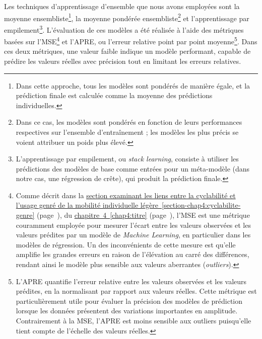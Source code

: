 \begin{refsegment}
Les techniques d'apprentissage d'ensemble que nous avons employées sont la moyenne ensembliste\footnote{
    Dans cette approche, tous les modèles sont pondérés de manière égale, et la prédiction finale est calculée comme la moyenne des prédictions individuelles.
}, la moyenne pondérée ensembliste\footnote{
    Dans ce cas, les modèles sont pondérés en fonction de leurs performances respectives sur l'ensemble d'entraînement ; les modèles les plus précis se voient attribuer un poids plus élevé.
} et l'apprentissage par empilement\footnote{
    L'apprentissage par empilement, ou \textsl{stack learning}, consiste à utiliser les prédictions des modèles de base comme entrées pour un méta-modèle (dans notre cas, une régression de crête), qui produit la prédiction finale.
}. L'évaluation de ces modèles a été réalisée à l'aide des métriques basées sur l'\acrfull{MSE}\footnote{
    Comme décrit dans la \hyperref[section-chap4:cyclabilite-genre]{section examinant les liens entre la cyclabilité et l'usage genré de la mobilité individuelle légère~\ref{section-chap4:cyclabilite-genre}} (page~\pageref{section-chap4:cyclabilite-genre}), du \hyperref[chap4:titre]{chapitre~4~\ref{chap4:titre}} (page~\pageref{chap4:titre}), l'\acrfull{MSE} est une métrique couramment employée pour mesurer l'écart entre les valeurs observées et les valeurs prédites par un modèle de \textsl{Machine Learning}, en particulier dans les modèles de régression. Un des inconvénients de cette mesure est qu'elle amplifie les grandes erreurs en raison de l'élévation au carré des différences, rendant ainsi le modèle plus sensible aux valeurs aberrantes (\textsl{outliers}).
} et l'\acrfull{APRE}, ou l'erreur relative point par point moyenne\footnote{
    L'\acrfull{APRE} quantifie l'erreur relative entre les valeurs observées et les valeurs prédites, en la normalisant par rapport aux valeurs réelles. Cette \gls{métrique} est particulièrement utile pour évaluer la précision des modèles de prédiction lorsque les données présentent des variations importantes en amplitude. Contrairement à la \acrshort{MSE}, l'\acrshort{APRE} est moins sensible aux outliers puisqu'elle tient compte de l'échelle des valeurs réelles. 
}. Dans ces deux métriques, une valeur faible indique un modèle performant, capable de prédire les valeurs réelles avec précision tout en limitant les erreurs relatives.%


\end{refsegment}
